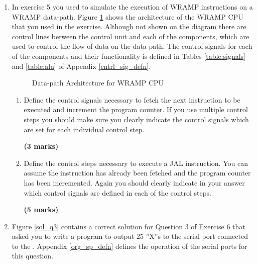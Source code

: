 \documentclass[a4paper,10pt]{article}
\begin{document}
\newcommand{\marks}[1]
{\begin{flushright}{\bf (#1 marks)}\end{flushright}}

\EXTESTHEADING{\IONO}{\IOTESTDATE}



\begin{enumerate}


\item  In exercise 5 you used  to simulate the
execution of WRAMP instructions on a WRAMP data-path. Figure
\ref{fig:wrampblok} shows the architecture of the WRAMP CPU that
you used in the exercise. Although not shown on the diagram there are
control lines between the control unit and each of the components,
which are used to control the flow of data on the data-path. The
control signals for each of the components and their functionality is
defined in Tables \ref{table:signals} and
\ref{table:alu} of Appendix \ref{cntrl_sig_defn}. 

\begin{figure}[h]
\begin{center}
    \caption{Data-path Architecture for WRAMP CPU}
    \label{fig:wrampblok}
  \end{center}
\end{figure}


\begin{enumerate} 

  \item Define the control signals necessary to fetch the next
  instruction to be executed and increment the program counter. If you
  use multiple control steps you should make sure you clearly indicate
  the control signals which are set for each individual control step.

  \marks{3}

  \item Define the control steps necessary to execute a JAL
  instruction. You can assume the instruction has already been fetched
  and the program counter has been incremented. Again you should
  clearly indicate in your answer which control signals are defined in
  each of the control steps.

  \marks{5} 

\end{enumerate}

\newpage
\item Figure \ref{sol_q3} contains a correct solution for Question 3
of Exercise 6 that asked you to write a program to output 25 ''X''s to
the serial port connected to the . Appendix
\ref{org_sp_defn} defines the operation of the serial ports for this
question.


\end{enumerate}
\end{document}
